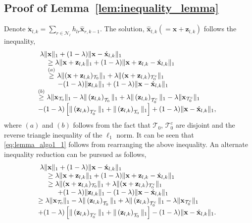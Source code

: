 \documentclass[journal]{IEEEtran}
\newcommand{\mbx}{\mathbf{x}}
\newcommand{\mbz}{\mathbf{z}}
\newcommand{\T}{\mathcal{T}}
\begin{document}
\subsection{Proof of Lemma~\ref{lem:inequality_lemma}}
Denote $\acute{\mbx}_{l,k} = \sum\limits_{r \in \mathcal{N}_l} h_{lr} \hat{\mbx}_{r,k-1}$. The solution, $\hat{\mbx}_{l,k} \left(= \mbx + \mbz_{l,k}\right)$ follows the inequality,
\begin{eqnarray*}
\begin{array}{rl}
&\hspace{-4mm} \lambda \|\mbx\|_1 + (1-\lambda) \|\mbx-\acute{\mbx}_{l,k}\|_1 \\
&\geq \lambda \|\mbx + \mbz_{l,k}\|_1 + (1-\lambda) \|\mbx + \mbz_{l,k} - \acute{\mbx}_{l,k}\|_1 \\
&\stackrel{(a)}{\geq} \lambda \|(\mbx + \mbz_{l,k})_{\T_0}\|_1 + \lambda \|(\mbx + \mbz_{l,k})_{\T_0^c}\|_1 \\ 
& \hspace{5mm} - (1-\lambda) \|\mbz_{l,k} \|_1 + (1-\lambda) \|\mbx  - \acute{\mbx}_{l,k}\|_1 \\
& \hspace{-5mm} \stackrel{(b)}{\geq} \lambda\|\mbx_{\T_0}\|_1 - \lambda\|\left(\mbz_{l,k}\right)_{\T_0}\|_1 + \lambda\|\left(\mbz_{l,k}\right)_{\T_0^c}\|_1 -                 \lambda\|\mbx_{\T_0^c}\|_1 \\
& \hspace{-5mm} - (1-\lambda) \left[\|\left(\mbz_{l,k}\right)_{\T_0^c} \|_1+ \|\left(\mbz_{l,k}\right)_{\T_0} \|_1\right] + (1-\lambda) \|\mbx  - \acute{\mbx}_{l,k}\|_1 ,
\end{array}
\end{eqnarray*}
where $(a)$ and $(b)$ follows from the fact that $\T_0$, $\T_0^c$ are disjoint and the reverse triangle inequality of the $\ell_1$ norm. It can be seen that \eqref{eq:lemma_algo1_1} follows from rearranging the above inequality.
An alternate inequality reduction can be pursued as follows,
\begin{eqnarray*}
\begin{array}{rl}
&\hspace{-4mm} \lambda \|\mbx\|_1 + (1-\lambda) \|\mbx-\acute{\mbx}_{l,k}\|_1 \\
&\geq \lambda \|\mbx + \mbz_{l,k}\|_1 + (1-\lambda) \|\mbx + \mbz_{l,k} - \acute{\mbx}_{l,k}\|_1 \\
&\geq \lambda \|(\mbx + \mbz_{l,k})_{\T_0}\|_1 + \lambda \|(\mbx + \mbz_{l,k})_{\T_0^c}\|_1 \\ 
& \hspace{5mm} + (1-\lambda) \|\mbz_{l,k} \|_1 - (1-\lambda) \|\mbx  - \acute{\mbx}_{l,k}\|_1 \\
& \hspace{-5mm} \geq \lambda\|\mbx_{\T_0}\|_1 - \lambda\|\left(\mbz_{l,k}\right)_{\T_0}\|_1 + \lambda\|\left(\mbz_{l,k}\right)_{\T_0^c}\|_1 -                 \lambda\|\mbx_{\T_0^c}\|_1 \\
& \hspace{-5mm} + (1-\lambda) \left[\|\left(\mbz_{l,k}\right)_{\T_0^c} \|_1+ \|\left(\mbz_{l,k}\right)_{\T_0} \|_1\right] - (1-\lambda) \|\mbx  - \acute{\mbx}_{l,k}\|_1.
\end{array}
\end{eqnarray*}
\end{document}
